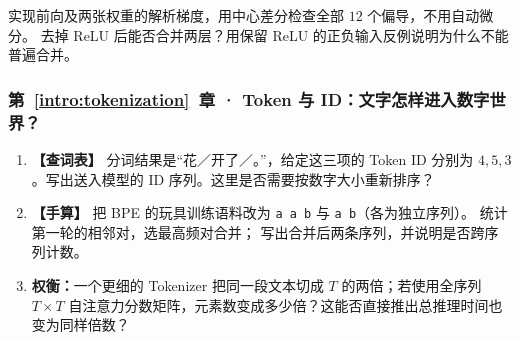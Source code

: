 \begin{enumerate}[label={},leftmargin=4.8em,itemsep=4pt]
实现前向及两张权重的解析梯度，用中心差分检查全部 $12$ 个偏导，不用自动微分。
去掉 ReLU 后能否合并两层？用保留 ReLU 的正负输入反例说明为什么不能普遍合并。
\end{enumerate}
\subsubsection*{第~\ref*{intro:tokenization}~章 · Token 与 ID：文字怎样进入数字世界？}
\begin{enumerate}[label={},leftmargin=4.8em,itemsep=4pt]
\item[\textbf{C-038.}] \leavevmode{}\label{exercise:C-038}\label{exercise:token-id-lookup}\textbf{【查词表】} 分词结果是“花／开了／。”，给定这三项的 Token ID 分别为 $4,5,3$。写出送入模型的 ID 序列。这里是否需要按数字大小重新排序？
\item[\textbf{C-039.}] \leavevmode{}\label{exercise:C-039}\label{exercise:bpe-pair-merge}\textbf{【手算】} 把 BPE 的玩具训练语料改为
\texttt{a a b} 与 \texttt{a b}（各为独立序列）。
统计第一轮的相邻对，选最高频对合并；
写出合并后两条序列，并说明是否跨序列计数。
\item[\textbf{C-040.}] \leavevmode{}\label{exercise:C-040}\label{exercise:tokenizer-attention-cost}\textbf{权衡：}一个更细的 Tokenizer 把同一段文本切成 $T$ 的两倍；若使用全序列 $T\times T$ 自注意力分数矩阵，元素数变成多少倍？这能否直接推出总推理时间也变为同样倍数？
\end{enumerate}

